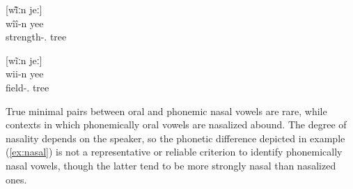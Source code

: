 	
	\ea \label{ex:nasal}
		[wĩ̃ːn jeː]\\
		\gll wîî-n yee\\
		 strength-. tree\\
		\glt {}
		\z
		
		
		\ea \label{ex:nasal2}
		[wĩːn jeː]\\
		\gll wii-n yee\\
		 field-. tree\\
		\glt {}
	\z  



True minimal pairs between oral and phonemic nasal vowels are rare, while contexts in which phonemically oral vowels are nasalized abound. The degree of nasality depends on the speaker, so the phonetic difference depicted in example (\ref{ex:nasal}) is not a representative or reliable criterion to identify phonemically nasal vowels, though the latter tend to be more strongly nasal than nasalized ones. %
	
%		
%		
%	

